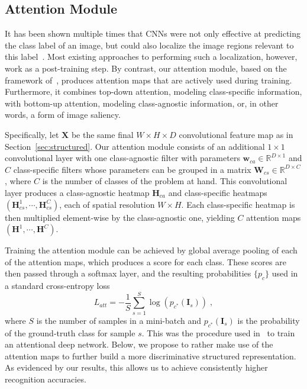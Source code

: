 \documentclass{bmvc2k}
\newcommand{\bX}{\mathbf{X}}
\newcommand{\bI}{\mathbf{I}}
\newcommand{\bW}{\mathbf{W}}
\newcommand{\bw}{\mathbf{w}}
\newcommand{\bH}{\mathbf{H}}
\begin{document}
\subsection{Attention Module}\label{sec:attention}

It has been shown multiple times that CNNs were not only effective at predicting the class label of an image, but could also localize the image regions relevant to this label~\cite{CAM,CWCAM,gradCAM}. Most existing approaches to performing such a localization, however, work as a post-training step. By contrast, our attention module, based on the framework of~\cite{Attpool}, produces attention maps that are actively used during training. Furthermore, it combines top-down attention, modeling class-specific information, with bottom-up attention, modeling class-agnostic information, or, in other words, a form of image saliency.

Specifically, let $\bX$ be the same final $W \times H \times D$ convolutional feature map as in Section~\ref{sec:structured}. Our attention module consists of an additional $1 \times 1$ convolutional layer with one class-agnostic filter with parameters $\bw_{ca} \in \mathbb{R}^{D \times 1}$ and $C$ class-specific filters whose parameters can be grouped in a matrix $\bW_{cs} \in \mathbb{R}^{D \times C}$, where $C$ is the number of classes of the problem at hand. This convolutional layer produces a class-agnostic heatmap $\bH_{ca}$  and class-specific heatmaps $(\bH_{cs}^{1},\cdots,\bH_{cs}^{C})$, each of spatial resolution $W \times H$. Each class-specific heatmap is then multiplied element-wise by the class-agnostic one, yielding $C$ attention maps $(\bH^{1},\cdots,\bH^{C})$.

Training the attention module can be achieved by global average pooling of each of the attention maps, which produces a score for each class. These scores are then passed through a softmax layer, and the resulting probabilities $\{p_c\}$ used in a standard cross-entropy loss
\begin{equation}
L_{att} = - \frac{1}{S} \sum_{s=1}^S \log(p_{c^*}(\bI_s))\;,
\label{eq:att_loss}
\end{equation}
where $S$ is the number of samples in a mini-batch and $p_{c^*}(\bI_s)$ is the probability of the ground-truth class for sample $s$. This was the procedure used in~\cite{Attpool} to train an attentional deep network. Below, we propose to rather make use of the attention maps to further build a more discriminative structured representation. As evidenced by our results, this allows us to achieve consistently higher recognition accuracies.
\end{document}
